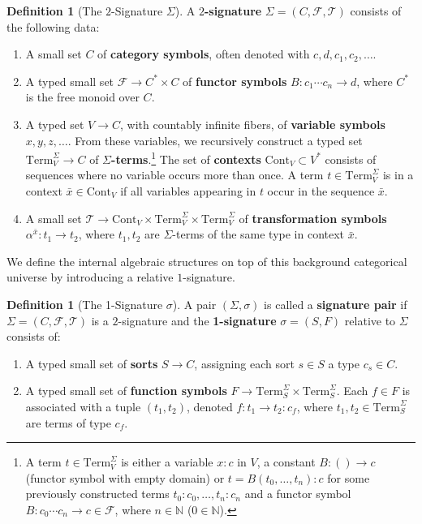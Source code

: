 \documentclass[11pt]{article}
\theoremstyle{plain}
\theoremstyle{definition}
\newtheorem{definition}[theorem]{Definition}
\numberwithin{equation}{section}
\newcommand{\Term}{\mathrm{Term}}
\begin{document}
\begin{definition}[The $2$-Signature $\Sigma$]
   A \textbf{$2$-signature} $\Sigma = (C,\mathcal{F}, \mathcal{T})$ consists of the following data:
   \begin{enumerate}
       \item A small set $C$ of \textbf{category symbols}, often denoted with $c,d,c_1,c_2,\dots$.
       \item A typed small set $\mathcal{F} \to C^* \times C$ of \textbf{functor symbols} $B \colon c_1 \cdots c_n \to d$, where $C^*$ is the free monoid over $C$.
       \item A typed set $V \to C$, with countably infinite fibers, of \textbf{variable symbols} $x,y,z,\dots$. From these variables, we recursively construct a typed set $\Term^\Sigma_V \to C$ of \textbf{$\Sigma$-terms}.\footnote{A term $t\in \Term_V^\Sigma$ is either a variable $x\colon c$ in $V$, a constant $B\colon ()\to c$ (functor symbol with empty domain) or $t = B(t_0,\ldots, t_n)\colon c$ for some previously constructed terms $t_0\colon c_0,\ldots, t_n\colon c_n$ and a functor symbol $B\colon c_0\cdots c_n\to c\in \mathcal{F}$, where $n\in \mathbb{N}$ ($0\in \mathbb{N}$).} The set of \textbf{contexts} $\mathrm{Cont}_V \subset V^*$ consists of sequences where no variable occurs more than once. A term $t \in \mathrm{Term}_V^\Sigma$ is in a context $\bar{x} \in \mathrm{Cont}_V$ if all variables appearing in $t$ occur in the sequence $\bar{x}$.
       \item A small set $\mathcal{T} \to \mathrm{Cont}_V \times \mathrm{Term}^\Sigma_V \times \mathrm{Term}^\Sigma_V$ of \textbf{transformation symbols} $\alpha^{\bar{x}} \colon t_1 \to t_2$, where $t_1, t_2$ are $\Sigma$-terms of the same type in context $\bar{x}$.
   \end{enumerate}
\end{definition}

We define the internal algebraic structures on top of this background categorical universe by introducing a relative $1$-signature.

\begin{definition}[The 1-Signature $\sigma$]
   A pair $(\Sigma,\sigma)$ is called a \textbf{signature pair} if $\Sigma = (C,\mathcal{F},\mathcal{T})$ is a $2$-signature and the \textbf{1-signature} $\sigma = (S, F)$ relative to $\Sigma$ consists of:
   \begin{enumerate}
       \item A typed small set of \textbf{sorts} $S \to C$, assigning each sort $s \in S$ a type $c_s \in C$.
       \item A typed small set of \textbf{function symbols} $F \to \mathrm{Term}_{S}^\Sigma \times \mathrm{Term}_{S}^\Sigma$. Each $f \in F$ is associated with a tuple $(t_1,t_2)$, denoted $f\colon t_1 \to t_2 \colon c_f$, where $t_1, t_2\in \Term_S^\Sigma$ are terms of type $c_f$.
   \end{enumerate}
\end{definition}
\end{document}
